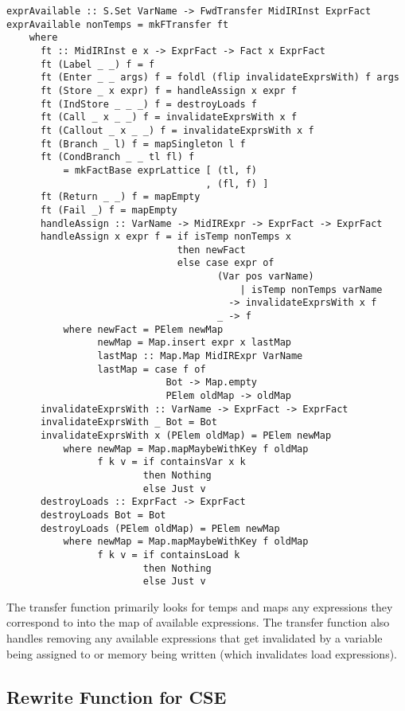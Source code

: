 \documentclass[11pt]{article}
\begin{document}
\begin{verbatim}
exprAvailable :: S.Set VarName -> FwdTransfer MidIRInst ExprFact 
exprAvailable nonTemps = mkFTransfer ft 
    where
      ft :: MidIRInst e x -> ExprFact -> Fact x ExprFact 
      ft (Label _ _) f = f
      ft (Enter _ _ args) f = foldl (flip invalidateExprsWith) f args
      ft (Store _ x expr) f = handleAssign x expr f
      ft (IndStore _ _ _) f = destroyLoads f
      ft (Call _ x _ _) f = invalidateExprsWith x f
      ft (Callout _ x _ _) f = invalidateExprsWith x f 
      ft (Branch _ l) f = mapSingleton l f
      ft (CondBranch _ _ tl fl) f 
          = mkFactBase exprLattice [ (tl, f) 
                                   , (fl, f) ]
      ft (Return _ _) f = mapEmpty 
      ft (Fail _) f = mapEmpty 
      handleAssign :: VarName -> MidIRExpr -> ExprFact -> ExprFact
      handleAssign x expr f = if isTemp nonTemps x 
                              then newFact 
                              else case expr of  
                                     (Var pos varName) 
                                         | isTemp nonTemps varName 
                                       -> invalidateExprsWith x f
                                     _ -> f
          where newFact = PElem newMap 
                newMap = Map.insert expr x lastMap
                lastMap :: Map.Map MidIRExpr VarName
                lastMap = case f of
                            Bot -> Map.empty
                            PElem oldMap -> oldMap
      invalidateExprsWith :: VarName -> ExprFact -> ExprFact
      invalidateExprsWith _ Bot = Bot 
      invalidateExprsWith x (PElem oldMap) = PElem newMap 
          where newMap = Map.mapMaybeWithKey f oldMap 
                f k v = if containsVar x k
                        then Nothing
                        else Just v 
      destroyLoads :: ExprFact -> ExprFact 
      destroyLoads Bot = Bot 
      destroyLoads (PElem oldMap) = PElem newMap
          where newMap = Map.mapMaybeWithKey f oldMap
                f k v = if containsLoad k 
                        then Nothing
                        else Just v
\end{verbatim}

The transfer function primarily looks for temps and maps any expressions they correspond to into the map of available expressions. The transfer function also handles removing any available expressions that get invalidated by a variable being assigned to or memory being written (which invalidates load expressions). 

\subsection {Rewrite Function for CSE}
\end{document}
